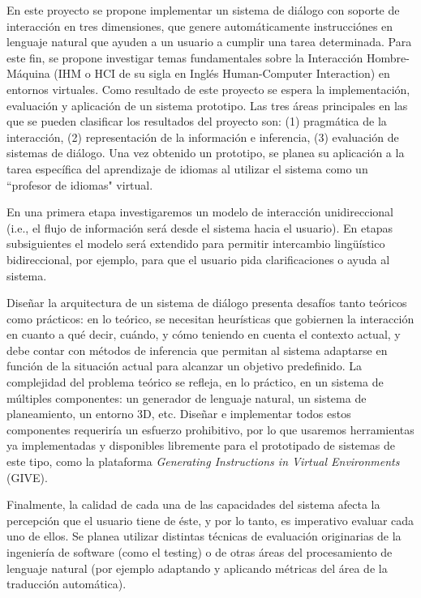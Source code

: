
En este proyecto se propone implementar un sistema de di\'alogo con
soporte de interacci\'on en tres dimensiones,  que genere autom\'aticamente
instrucci\'ones en lenguaje natural que ayuden a un usuario a cumplir una tarea determinada. Para este fin, se propone investigar temas fundamentales sobre la
Interacci\'on Hombre-M\'aquina (IHM o HCI de su sigla en Ingl\'es Human-Computer Interaction) en entornos virtuales. Como resultado de este proyecto se espera la implementaci\'on, evaluaci\'on y aplicaci\'on de un sistema prototipo. Las tres
\'areas principales en las que se pueden clasificar los resultados del proyecto son: (1) pragm\'atica de la interacci\'on, (2) representaci\'on
de la informaci\'on e inferencia, (3) evaluaci\'on de sistemas
de di\'alogo. Una vez obtenido
un prototipo, se planea su aplicaci\'on a la tarea espec\'ifica del aprendizaje de idiomas al utilizar el sistema como un ``profesor de idiomas" virtual.

En una primera etapa investigaremos un modelo de interacci\'on unidireccional
(i.e., el flujo de informaci\'on ser\'a desde el sistema hacia el usuario).
En etapas subsiguientes el modelo ser\'a extendido para
permitir intercambio ling\"u\'istico bidireccional, por ejemplo, para que el usuario pida clarificaciones o ayuda al sistema.

Dise\~nar la arquitectura de un sistema de di\'alogo presenta
desaf\'ios tanto te\'oricos como pr\'acticos: en lo te\'orico, se necesitan
heur\'isticas que gobiernen la interacci\'on en cuanto a qu\'e decir,
cu\'ando, y c\'omo teniendo en cuenta el contexto actual, y debe contar con m\'etodos
de inferencia que permitan al sistema adaptarse en funci\'on de la situaci\'on actual para alcanzar un objetivo predefinido.
La complejidad del problema te\'orico se
refleja, en lo pr\'actico, en un sistema de m\'ultiples componentes: un
generador de lenguaje natural, un sistema de planeamiento, un entorno 3D, etc.
Dise\~nar e implementar todos estos componentes requerir\'ia un esfuerzo prohibitivo, por lo que usaremos herramientas ya implementadas y disponibles libremente para el prototipado de sistemas de este tipo, como la plataforma \textit{Generating Instructions in Virtual Environments} (GIVE).

Finalmente, la calidad de cada una de las capacidades del sistema afecta la percepci\'on que el usuario tiene de \'este, y por lo tanto, es imperativo evaluar cada uno de ellos.
Se planea utilizar distintas t\'ecnicas de evaluaci\'on originarias de la ingenier\'ia de software (como el testing) o de otras \'areas del procesamiento de lenguaje natural (por ejemplo adaptando y aplicando m\'etricas del \'area de la traducci\'on autom\'atica).
